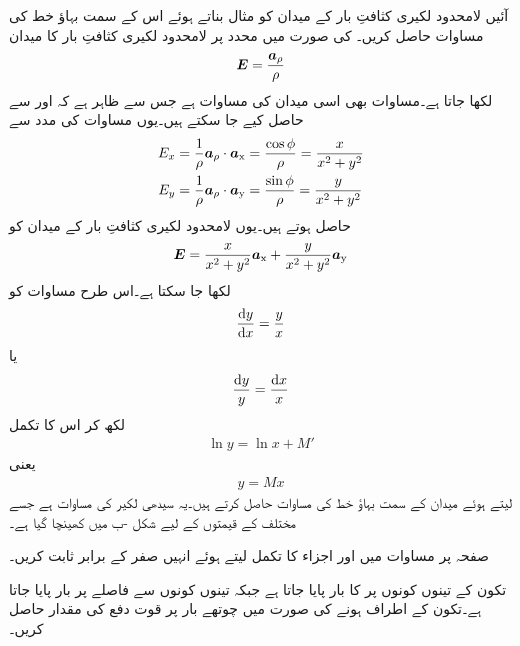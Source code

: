 آئیں لامحدود لکیری کثافتِ بار کے میدان کو مثال بناتے ہوئے اس  کے سمت بہاؤ خط کی مساوات حاصل کریں۔ کی صورت میں  محدد پر لامحدود لکیری کثافتِ بار کا میدان
\begin{align}\label{مساوات_کولمب_لکیری_میدان_دوبارہ}
{\ensuremath{{\boldsymbol{E}}}}=\frac{{\boldsymbol{a}}_{\rho}}{\rho}
\end{align}
لکھا جاتا ہے۔مساوات  بھی اسی میدان کی مساوات ہے جس سے ظاہر ہے کہ  اور  سے حاصل کیے جا سکتے ہیں۔یوں مساوات  کی مدد سے
\begin{align*}
E_x&=\frac{1}{\rho} {\boldsymbol{a}}_{\rho} \cdot {\boldsymbol{a}}_{\textup{x}}=\frac{\cos \phi}{\rho}=\frac{x}{x^2+y^2}\\
E_y&=\frac{1}{\rho} {\boldsymbol{a}}_{\rho} \cdot {\boldsymbol{a}}_{\textup{y}}=\frac{\sin \phi}{\rho}=\frac{y}{x^2+y^2}
\end{align*} 
حاصل ہوتے ہیں۔یوں لامحدود لکیری کثافتِ بار کے میدان کو
\begin{align}
{\ensuremath{{\boldsymbol{E}}}}=\frac{x}{x^2+y^2}{\boldsymbol{a}}_{\textup{x}}+\frac{y}{x^2+y^2}{\boldsymbol{a}}_{\textup{y}}
\end{align}
لکھا جا سکتا ہے۔اس طرح مساوات  کو
\begin{align*}
\frac{\dif y}{\dif x}=\frac{y}{x}
\end{align*}
یا
\begin{align*}
\frac{\dif y}{y}=\frac{\dif x}{x}
\end{align*}
لکھ کر اس کا تکمل
\begin{align*}
\ln y = \ln x +M'
\end{align*}
یعنی
\begin{align}
y=Mx
\end{align}
لیتے ہوئے میدان کے سمت بہاؤ خط کی مساوات حاصل کرتے ہیں۔یہ سیدھی لکیر کی مساوات ہے جسے مختلف  کے قیمتوں کے لیے شکل -ب میں کھینچا گیا ہے۔

\newpage
{}

صفحہ  پر مساوات  میں  اور  اجزاء کا تکمل لیتے ہوئے انہیں صفر کے برابر ثابت کریں۔

تکون کے تینوں کونوں پر  کا بار پایا جاتا ہے جبکہ تینوں کونوں سے  فاصلے پر  بار پایا جاتا ہے۔تکون کے اطراف  ہونے کی صورت میں چوتھے بار پر قوت دفع  کی مقدار حاصل کریں۔

